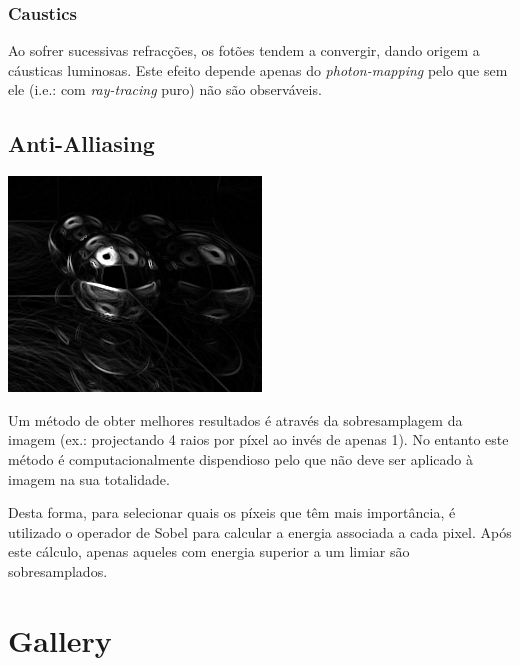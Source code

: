\documentclass[a4paper]{article}
\begin{document}
\subsubsection{Caustics}
\indent \indent Ao sofrer sucessivas refracções, os fotões tendem a convergir, dando origem a cáusticas luminosas.
Este efeito depende apenas do \emph{photon-mapping} pelo que sem ele (i.e.: com \emph{ray-tracing} puro)
não são observáveis.

\cleardoublepage
\subsection{Anti-Alliasing}
\begin{center}
	\includegraphics[scale=0.50]{images/sobel.png}
	\label{fig:sobel}
\end{center}

\indent Um método de obter melhores resultados é através da sobresamplagem da imagem (ex.: projectando
4 raios por píxel ao invés de apenas 1). No entanto este método é computacionalmente dispendioso pelo que não
deve ser aplicado à imagem na sua totalidade.

\indent Desta forma, para selecionar quais os píxeis que têm mais importância, é utilizado o operador de Sobel
para calcular a energia associada a cada pixel. Após este cálculo, apenas aqueles com energia superior a um limiar
são sobresamplados.

\cleardoublepage
\section{Gallery}
\end{document}
